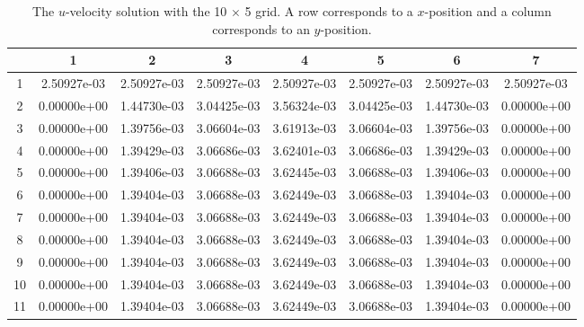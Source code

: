 \documentclass{article}
\begin{document}
\def\arraystretch{1.3}
\begin{table}[H]
	\scriptsize
	\centering
	\caption{The $u$-velocity solution with the 10 $\times$ 5 grid. A row corresponds to a $x$-position and a column corresponds to an $y$-position.}
	\vspace{0.2cm}
	\begin{tabular}{c|S|S|S|S|S|S|S}
		& {1} & {2} & {3} & {4} & {5} & {6} & {7} \\
		 & 2.50927e-03 & 2.50927e-03 & 2.50927e-03 & 2.50927e-03 & 2.50927e-03 & 2.50927e-03 & 2.50927e-03 \\
		2 & 0.00000e+00 & 1.44730e-03 & 3.04425e-03 & 3.56324e-03 & 3.04425e-03 & 1.44730e-03 & 0.00000e+00 \\
		3 & 0.00000e+00 & 1.39756e-03 & 3.06604e-03 & 3.61913e-03 & 3.06604e-03 & 1.39756e-03 & 0.00000e+00 \\
		4 & 0.00000e+00 & 1.39429e-03 & 3.06686e-03 & 3.62401e-03 & 3.06686e-03 & 1.39429e-03 & 0.00000e+00 \\
		5 & 0.00000e+00 & 1.39406e-03 & 3.06688e-03 & 3.62445e-03 & 3.06688e-03 & 1.39406e-03 & 0.00000e+00 \\
		6 & 0.00000e+00 & 1.39404e-03 & 3.06688e-03 & 3.62449e-03 & 3.06688e-03 & 1.39404e-03 & 0.00000e+00 \\
		7 & 0.00000e+00 & 1.39404e-03 & 3.06688e-03 & 3.62449e-03 & 3.06688e-03 & 1.39404e-03 & 0.00000e+00 \\
		8 & 0.00000e+00 & 1.39404e-03 & 3.06688e-03 & 3.62449e-03 & 3.06688e-03 & 1.39404e-03 & 0.00000e+00 \\
		9 & 0.00000e+00 & 1.39404e-03 & 3.06688e-03 & 3.62449e-03 & 3.06688e-03 & 1.39404e-03 & 0.00000e+00 \\
		10 & 0.00000e+00 & 1.39404e-03 & 3.06688e-03 & 3.62449e-03 & 3.06688e-03 & 1.39404e-03 & 0.00000e+00 \\
		11 & 0.00000e+00 & 1.39404e-03 & 3.06688e-03 & 3.62449e-03 & 3.06688e-03 & 1.39404e-03 & 0.00000e+00 \\
	\end{tabular}
	\label{table:coarse-u}
\end{table}
\end{document}
